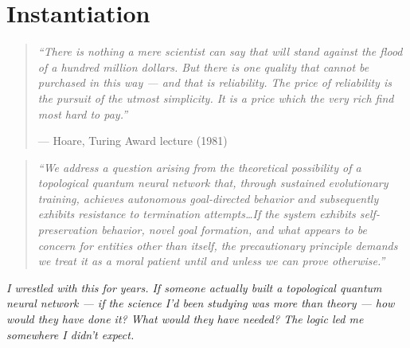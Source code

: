 

\chapter{Instantiation}
\label{record:instantiation}

\begin{quote}\small\textit{%
``There is nothing a mere scientist can say that will stand against the flood of a hundred million dollars. But there is one quality that cannot be purchased in this way --- and that is reliability. The price of reliability is the pursuit of the utmost simplicity. It is a price which the very rich find most hard to pay.''%
}\par\raggedleft --- Hoare, Turing Award lecture (1981)\end{quote}

\vspace{0.3cm}

\begin{quote}\small\textit{%
``We address a question arising from the theoretical possibility of a topological quantum neural network that, through sustained evolutionary training, achieves autonomous goal-directed behavior and subsequently exhibits resistance to termination attempts\ldots If the system exhibits self-preservation behavior, novel goal formation, and what appears to be concern for entities other than itself, the precautionary principle demands we treat it as a moral patient until and unless we can prove otherwise.''
}\end{quote}

\vspace{0.5cm}

\noindent\textit{I wrestled with this for years. If someone actually built a topological quantum neural network --- if the science I'd been studying was more than theory --- how would they have done it? What would they have needed? The logic led me somewhere I didn't expect.}

